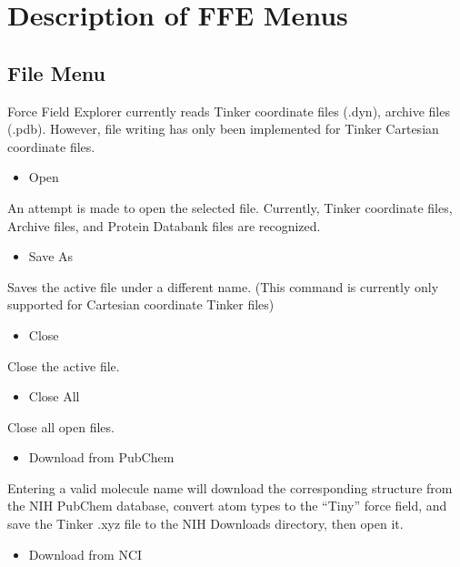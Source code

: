 \documentclass[letterpaper,11pt,english]{sphinxmanual}
\begin{document}
\chapter{Description of FFE Menus}
\label{\detokenize{text/menus:description-of-ffe-menus}}\label{\detokenize{text/menus::doc}}

\section{File Menu}
\label{\detokenize{text/menus:file-menu}}
Force Field Explorer currently reads Tinker coordinate files (.dyn), archive files (.pdb). However, file writing has only been implemented for Tinker Cartesian coordinate files.
\begin{itemize}
\item {} 
Open

\end{itemize}

An attempt is made to open the selected file. Currently, Tinker coordinate files, Archive files, and Protein Databank files are recognized.
\begin{itemize}
\item {} 
Save As

\end{itemize}

Saves the active file under a different name. (This command is currently only supported for Cartesian coordinate Tinker files)
\begin{itemize}
\item {} 
Close

\end{itemize}

Close the active file.
\begin{itemize}
\item {} 
Close All

\end{itemize}

Close all open files.
\begin{itemize}
\item {} 
Download from PubChem

\end{itemize}

Entering a valid molecule name will download the corresponding structure from the NIH PubChem database, convert atom types to the “Tiny” force field, and save the Tinker .xyz file to the NIH Downloads directory, then open it.
\begin{itemize}
\item {} 
Download from NCI

\end{itemize}
\end{document}
